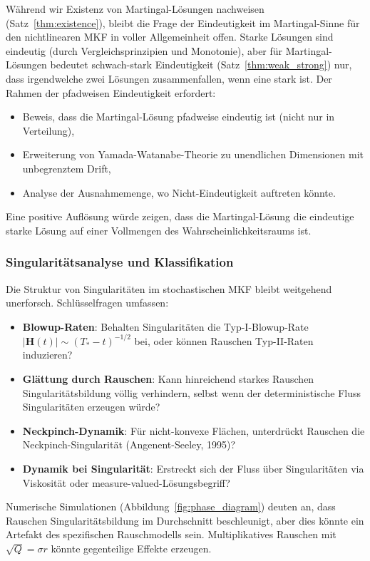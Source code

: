 \documentclass[a4paper,12pt]{article}
\theoremstyle{definition}
\begin{document}
Während wir Existenz von Martingal-Lösungen nachweisen (Satz~\ref{thm:existence}), bleibt die Frage der Eindeutigkeit im Martingal-Sinne für den nichtlinearen MKF in voller Allgemeinheit offen. Starke Lösungen sind eindeutig (durch Vergleichsprinzipien und Monotonie), aber für Martingal-Lösungen bedeutet schwach-stark Eindeutigkeit (Satz~\ref{thm:weak_strong}) nur, dass irgendwelche zwei Lösungen zusammenfallen, wenn eine stark ist. Der Rahmen der pfadweisen Eindeutigkeit erfordert:

\begin{itemize}
	\item Beweis, dass die Martingal-Lösung pfadweise eindeutig ist (nicht nur in Verteilung),
	\item Erweiterung von Yamada-Watanabe-Theorie zu unendlichen Dimensionen mit unbegrenztem Drift,
	\item Analyse der Ausnahmemenge, wo Nicht-Eindeutigkeit auftreten könnte.
\end{itemize}

Eine positive Auflösung würde zeigen, dass die Martingal-Lösung die eindeutige starke Lösung auf einer Vollmengen des Wahrscheinlichkeitsraums ist.

\subsubsection{Singularitätsanalyse und Klassifikation}

Die Struktur von Singularitäten im stochastischen MKF bleibt weitgehend unerforsch. Schlüsselfragen umfassen:

\begin{itemize}
	\item \textbf{Blowup-Raten}: Behalten Singularitäten die Typ-I-Blowup-Rate $|\mathbf{H}(t)| \sim (T_* - t)^{-1/2}$ bei, oder können Rauschen Typ-II-Raten induzieren?
	\item \textbf{Glättung durch Rauschen}: Kann hinreichend starkes Rauschen Singularitätsbildung völlig verhindern, selbst wenn der deterministische Fluss Singularitäten erzeugen würde?
	\item \textbf{Neckpinch-Dynamik}: Für nicht-konvexe Flächen, unterdrückt Rauschen die Neckpinch-Singularität (Angenent-Seeley, 1995)?
	\item \textbf{Dynamik bei Singularität}: Erstreckt sich der Fluss über Singularitäten via Viskosität oder measure-valued-Lösungsbegriff?
\end{itemize}

Numerische Simulationen (Abbildung~\ref{fig:phase_diagram}) deuten an, dass Rauschen Singularitätsbildung im Durchschnitt beschleunigt, aber dies könnte ein Artefakt des spezifischen Rauschmodells sein. Multiplikatives Rauschen mit $\sqrt{Q} = \sigma r$ könnte gegenteilige Effekte erzeugen.
\end{document}
